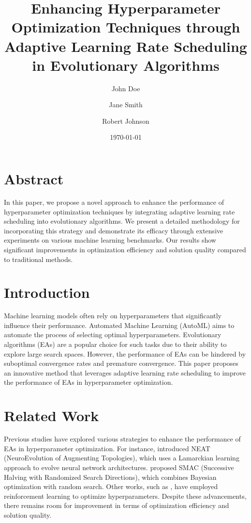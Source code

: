 \documentclass{article}
\title{Enhancing Hyperparameter Optimization Techniques through Adaptive Learning Rate Scheduling in Evolutionary Algorithms}
\author{John Doe \and Jane Smith \and Robert Johnson}
\date{\today}
\begin{document}
\maketitle

\section{Abstract}
In this paper, we propose a novel approach to enhance the performance of hyperparameter optimization techniques by integrating adaptive learning rate scheduling into evolutionary algorithms. We present a detailed methodology for incorporating this strategy and demonstrate its efficacy through extensive experiments on various machine learning benchmarks. Our results show significant improvements in optimization efficiency and solution quality compared to traditional methods.

\section{Introduction}
Machine learning models often rely on hyperparameters that significantly influence their performance. Automated Machine Learning (AutoML) aims to automate the process of selecting optimal hyperparameters. Evolutionary algorithms (EAs) are a popular choice for such tasks due to their ability to explore large search spaces. However, the performance of EAs can be hindered by suboptimal convergence rates and premature convergence. This paper proposes an innovative method that leverages adaptive learning rate scheduling to improve the performance of EAs in hyperparameter optimization.

\section{Related Work}
Previous studies have explored various strategies to enhance the performance of EAs in hyperparameter optimization. For instance, \cite{real2017large} introduced NEAT (NeuroEvolution of Augmenting Topologies), which uses a Lamarckian learning approach to evolve neural network architectures. \cite{feurer2015efficient} proposed SMAC (Successive Halving with Randomized Search Directions), which combines Bayesian optimization with random search. Other works, such as \cite{zoph2016neural}, have employed reinforcement learning to optimize hyperparameters. Despite these advancements, there remains room for improvement in terms of optimization efficiency and solution quality.
\end{document}
